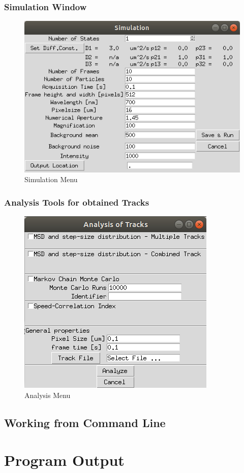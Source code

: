 \documentclass[oneside,letterpaper]{scrartcl}
\def\myscale{0.55}
\begin{document}
\subsubsection{Simulation Window}
\begin{figure}
\centering
\includegraphics[scale=\myscale]{Figures/SimulationGUI.jpg}
\caption{Simulation Menu}
\end{figure}


\subsubsection{Analysis Tools for obtained Tracks}
\begin{figure}
\centering
\includegraphics[scale=\myscale]{Figures/AnalysisGUI.jpg}
\caption{Analysis Menu}
\end{figure}


\subsection{Working from Command Line}

\section{Program Output}



\end{document}
